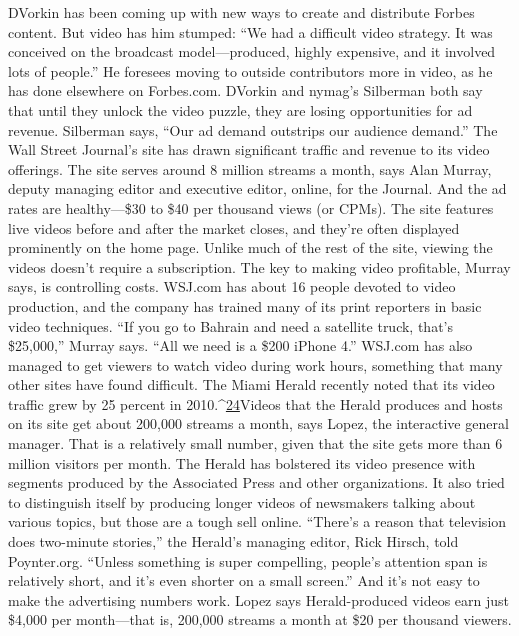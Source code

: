 DVorkin has been coming up with new ways to create and distribute Forbes
content. But video has him stumped: ``We had a difficult video strategy. It was
conceived on the broadcast model—produced, highly expensive, and it involved
lots of people.'' He foresees moving to outside contributors more in video, as he
has done elsewhere on Forbes.com. DVorkin and nymag's Silberman both say
that until they unlock the video puzzle, they are losing opportunities for ad revenue.
Silberman says, ``Our ad demand outstrips our audience demand.''
The Wall Street Journal's site has drawn significant traffic and revenue to its
video offerings. The site serves around 8 million streams a month, says Alan Murray,
deputy managing editor and executive editor, online, for the Journal. And the
ad rates are healthy—\$30 to \$40 per thousand views (or CPMs). The site features
live videos before and after the market closes, and they're often displayed prominently
on the home page. Unlike much of the rest of the site, viewing the videos
doesn't require a subscription.
The key to making video profitable, Murray says, is controlling costs. WSJ.com
has about 16 people devoted to video production, and the company has trained
many of its print reporters in basic video techniques. ``If you go to Bahrain and
need a satellite truck, that's \$25,000,'' Murray says. ``All we need is a \$200 iPhone
4.'' WSJ.com has also managed to get viewers to watch video during work hours,
something that many other sites have found difficult.
The Miami Herald recently noted that its video traffic grew by 25 percent in
2010.^{\href{#endnotes-chapter-4}{24}}Videos that the Herald produces and hosts on its site get about 200,000
streams a month, says Lopez, the interactive general manager. That is a relatively
small number, given that the site gets more than 6 million visitors per month.
The Herald has bolstered its video presence with segments produced by the
Associated Press and other organizations. It also tried to distinguish itself by producing
longer videos of newsmakers talking about various topics, but those are a
tough sell online. ``There's a reason that television does two-minute stories,'' the
Herald's managing editor, Rick Hirsch, told Poynter.org. ``Unless something is
super compelling, people's attention span is relatively short, and it's even shorter
on a small screen.'' And it's not easy to make the advertising numbers work. Lopez
says Herald-produced videos earn just \$4,000 per month—that is, 200,000
streams a month at \$20 per thousand viewers.
